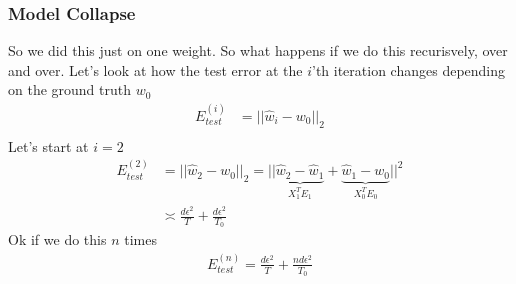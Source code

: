 \subsubsection{Model Collapse}
So we did this just on one weight. So what happens if we do this recurisvely, over and over. Let's look at how the test error at the $i$'th iteration changes depending on the ground truth $w_0$
\begin{align}
	E_{test}^{(i)} & = || \hat w_i - w_0 ||_2\\
\end{align}
Let's start at $i=2$
\begin{align}
	E_{test}^{(2)} & = || \hat w_2 - w_0 ||_2 = || \underbrace{\hat w_2 - \hat w_1}_{X_1^T E_1}  + \underbrace{\hat w_1 - w_0}_{X_0^T E_0} ||^2\\
	& \asymp \frac{d \epsilon^2 }{T} + \frac{d \epsilon^2}{T_0}
\end{align}
Ok if we do this $n$ times
\begin{align}
	E_{test}^{(n)} = \frac{d \epsilon^2}{T} + \frac{n d \epsilon^2}{T_0}
\end{align}













